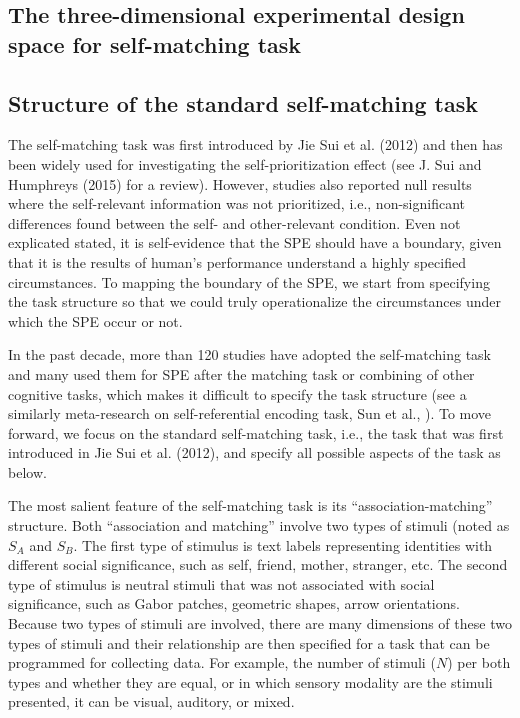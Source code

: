 \documentclass[
  english,
  man,floatsintext]{apa6}
\begin{document}
\subsection{The three-dimensional experimental design space for self-matching task}\label{the-three-dimensional-experimental-design-space-for-self-matching-task}

\subsection{Structure of the standard self-matching task}\label{structure-of-the-standard-self-matching-task}

The self-matching task was first introduced by Jie Sui et al. (2012) and then has been widely used for investigating the self-prioritization effect (see J. Sui and Humphreys (2015) for a review). However, studies also reported null results where the self-relevant information was not prioritized, i.e., non-significant differences found between the self- and other-relevant condition. Even not explicated stated, it is self-evidence that the SPE should have a boundary, given that it is the results of human's performance understand a highly specified circumstances. To mapping the boundary of the SPE, we start from specifying the task structure so that we could truly operationalize the circumstances under which the SPE occur or not.

In the past decade, more than 120 studies have adopted the self-matching task and many used them for SPE after the matching task or combining of other cognitive tasks, which makes it difficult to specify the task structure (see a similarly meta-research on self-referential encoding task, Sun et al., ). To move forward, we focus on the standard self-matching task, i.e., the task that was first introduced in Jie Sui et al. (2012), and specify all possible aspects of the task as below.

The most salient feature of the self-matching task is its ``association-matching'' structure. Both ``association and matching'' involve two types of stimuli (noted as \(S_A\) and \(S_B\). The first type of stimulus is text labels representing identities with different social significance, such as self, friend, mother, stranger, etc. The second type of stimulus is neutral stimuli that was not associated with social significance, such as Gabor patches, geometric shapes, arrow orientations. Because two types of stimuli are involved, there are many dimensions of these two types of stimuli and their relationship are then specified for a task that can be programmed for collecting data. For example, the number of stimuli (\(N\)) per both types and whether they are equal, or in which sensory modality are the stimuli presented, it can be visual, auditory, or mixed.
\end{document}
